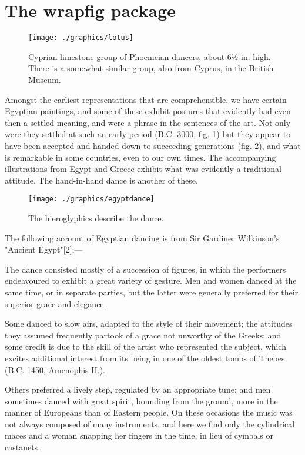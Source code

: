 \newpage
\section{The wrapfig package}

\captionsetup[wrapfigure]{margin=10pt,font=small,labelfont=bf, name=Fig.} %

\begin{wrapfigure}{r}{4.3cm}
   \texttt{[image: ./graphics/lotus]}
   \caption{\small Cyprian limestone group of Phoenician dancers, about 6½ in. high. There is a somewhat similar group, also from Cyprus, in the British Museum.}
\end{wrapfigure}

Amongst the earliest representations that are comprehensible, we have certain Egyptian paintings, and some of these exhibit postures that evidently had even then a settled meaning, and were a phrase in the sentences of the art. Not only were they settled at such an early period (B.C. 3000, fig. 1) but they appear to have been accepted and handed down to succeeding generations (fig. 2), and what is remarkable in some countries, even to our own times. The accompanying illustrations from Egypt and Greece exhibit what was evidently a traditional attitude. The hand-in-hand dance is another of these.

\begin{wrapfigure}[20]{l}{3.0cm}
\centering\small
\texttt{[image: ./graphics/egyptdance]}  %
\caption{\small The hieroglyphics describe the dance.}
\end{wrapfigure}


The following account of Egyptian dancing is from Sir Gardiner Wilkinson's "Ancient Egypt"[2]:—

The dance consisted mostly of a succession of figures, in which the performers endeavoured to exhibit a great variety of gesture. Men and women danced at the same time, or in separate parties, but the latter were generally preferred for their superior grace and elegance.

Some danced to slow airs, adapted to the style of their movement; the attitudes they assumed frequently partook of a grace not unworthy of the Greeks; and some credit is due to the skill of the artist who represented the subject, which excites additional interest from its being in one of the oldest tombs of Thebes (B.C. 1450, Amenophis II.).

Others preferred a lively step, regulated by an appropriate tune; and men sometimes danced with great spirit, bounding from the ground, more in the manner of Europeans than of Eastern people. On these occasions the music was not always composed of many instruments, and here we find only the cylindrical maces and a woman snapping her fingers in the time, in lieu of cymbals or castanets.

